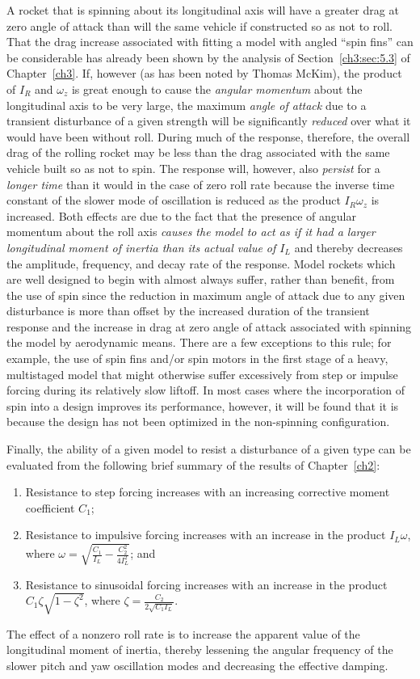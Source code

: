 A rocket that is spinning about its longitudinal axis will have a greater drag at zero angle of
attack than will the same vehicle if constructed so as not to roll. That the drag increase
associated with fitting a model with angled ``spin fins'' can be considerable has already been
shown by the analysis of Section~\ref{ch3:sec:5.3} of Chapter~\ref{ch3}. If, however (as has been
noted by Thomas McKim), the product of $I_R$ and $\omega_z$ is great enough to cause the
\emph{angular momentum} about the longitudinal axis to be very large, the maximum \emph{angle of
attack} due to a transient disturbance of a given strength will be significantly \emph{reduced}
over what it would have been without roll. During much of the response, therefore, the overall
drag of the rolling rocket may be less than the drag associated with the same vehicle built so as
not to spin. The response will, however, also \emph{persist} for a \emph{longer time} than it would
in the case of zero roll rate because the inverse time constant of the slower mode of oscillation
is reduced as the product $I_R\omega_z$ is increased. Both effects are due to the fact that the
presence of angular momentum about the roll axis \emph{causes the model to act as if it had a
larger longitudinal moment of inertia than its actual value of $I_L$} and thereby decreases the
amplitude, frequency, and decay rate of the response. Model rockets which are well designed to
begin with almost always suffer, rather than benefit, from the use of spin since the reduction in
maximum angle of attack due to any given disturbance is more than offset by the increased duration
of the transient response and the increase in drag at zero angle of attack associated with
spinning the model by aerodynamic means. There are a few exceptions to this rule; for example, the
use of spin fins and/or spin motors in the first stage of a heavy, multistaged model that might
otherwise suffer excessively from step or impulse forcing during its relatively slow liftoff. In
most cases where the incorporation of spin into a design improves its performance, however, it
will be found that it is because the design has not been optimized in the non-spinning
configuration.

Finally, the ability of a given model to resist a disturbance of a given type can be evaluated
from the following brief summary of the results of Chapter~\ref{ch2}:
\begin{enumerate}[label=(\alph*)]
  \item Resistance to step forcing increases with an increasing corrective moment coefficient
    $C_1$;
  \item Resistance to impulsive forcing increases with an increase in the product $I_L\omega$,
    where $\omega = \sqrt{\frac{C_1}{I_L} - \frac{C_2^{2}}{4I_L^{2}}}$; and
  \item Resistance to sinusoidal forcing increases with an increase in the product
    $C_1\zeta\sqrt{1 - \zeta^{2}}$, where $\zeta = \frac{C_2}{2\sqrt{C_1I_L}}$.
\end{enumerate}
The effect of a nonzero roll rate is to increase the apparent value of the longitudinal moment of
inertia, thereby lessening the angular frequency of the slower pitch and yaw oscillation modes and
decreasing the effective damping.
